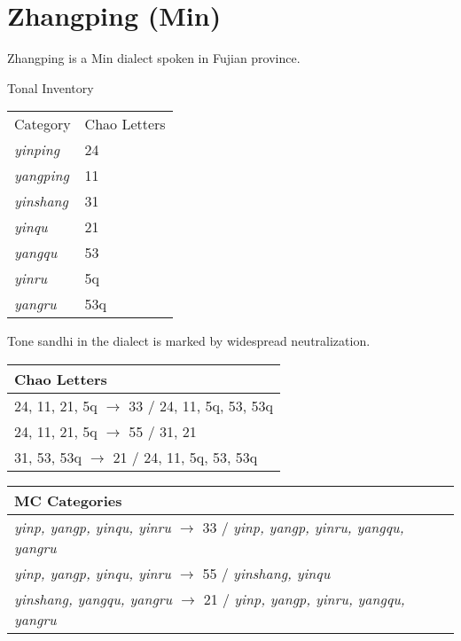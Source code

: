 \documentclass{article}
\begin{document}
\section{Zhangping (Min)}
Zhangping is a Min dialect spoken in Fujian province.\cite{Zhang1982, chen2000}
\begin{exe}
\ex Tonal Inventory \\
\begin{tabular}[t]{|ll|}
\hline
Category & Chao Letters \\
\textit{yinping} & 24 \\
\textit{yangping} & 11 \\
\textit{yinshang} & 31 \\
\textit{yinqu} &  21 \\
\textit{yangqu} & 53 \\
\textit{yinru} & 5q \\
\textit{yangru} & 53q \\
\hline
\end{tabular}
\end{exe}
Tone sandhi in the dialect is marked by widespread neutralization.
\begin{exe}
\ex
\begin{tabular}[t]{l}
Chao Letters \\
\hline
24, 11, 21, 5q $\rightarrow$ 33 / \underline{\hspace{1em}} 24, 11, 5q, 53, 53q \\ 
24, 11, 21, 5q $\rightarrow$ 55 / \underline{\hspace{1em}} 31, 21 \\
31, 53, 53q $\rightarrow$ 21 / \underline{\hspace{1em}} 24, 11, 5q, 53, 53q \\  
\end{tabular}
\ex
\begin{tabular}[t]{l}
MC Categories \\
\hline
\textit{yinp, yangp, yinqu, yinru} $\rightarrow$ 33 / \underline{\hspace{1em}} \textit{yinp, yangp, yinru, yangqu, yangru} \\
\textit{yinp, yangp, yinqu, yinru} $\rightarrow$ 55 / \underline{\hspace{1em}} \textit{yinshang, yinqu} \\
\textit{yinshang, yangqu, yangru} $\rightarrow$ 21 / \underline{\hspace{1em}} \textit{yinp, yangp, yinru, yangqu, yangru} \\
\end{tabular}
\end{exe}
\end{document}
